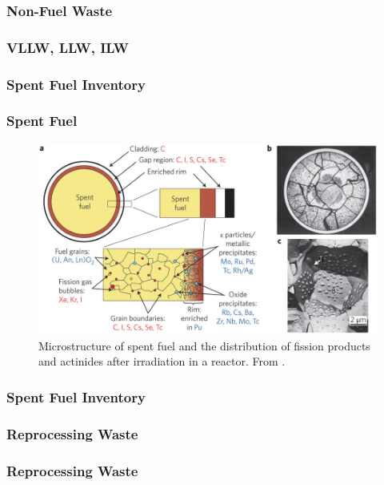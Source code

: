
\begin{frame}[c]
  \frametitle{Non-Fuel Waste}
  
\end{frame}

\begin{frame}[fragile]
        \frametitle{VLLW, LLW, ILW}
                
\end{frame}

\begin{frame}[fragile]
        \frametitle{Spent Fuel Inventory}
                
\end{frame}

\begin{frame}[fragile]
        \frametitle{Spent Fuel}
        \begin{figure}
        \includegraphics[width=\textwidth]{./images/ewing-microstructure}
                \caption{Microstructure of spent fuel and the distribution of
                fission products and actinides after irradiation in a reactor.
                From \cite{ewing_long-term_2015}.}
        \end{figure}
\end{frame}

\begin{frame}[fragile]
        \frametitle{Spent Fuel Inventory}
                
\end{frame}


\begin{frame}[fragile]
        \frametitle{Reprocessing Waste}
                
\end{frame}

\begin{frame}[fragile]
        \frametitle{Reprocessing Waste}
                
\end{frame}

